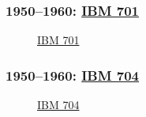 \documentclass[ignorenonframetext, hyperref=unicode]{beamer}
\begin{document}
\begin{frame}
\frametitle{1950--1960: \href{http://en.wikipedia.org/wiki/IBM_701}{IBM 701}}
\begin{figure}[h]
\center
{}
\caption{\href{http://www-03.ibm.com/ibm/history/exhibits/701/701_1415bx01.html}{IBM
701}}
\end{figure}
    
\end{frame}
   
\begin{frame}
\frametitle{1950--1960: \href{http://en.wikipedia.org/wiki/IBM_704}{IBM 704}}
\begin{figure}[h]
\center
{}
\caption{\href{http://en.wikipedia.org/wiki/Image:Ibm704.gif}{IBM
704}}
\end{figure}
    
\end{frame}
\end{document}
